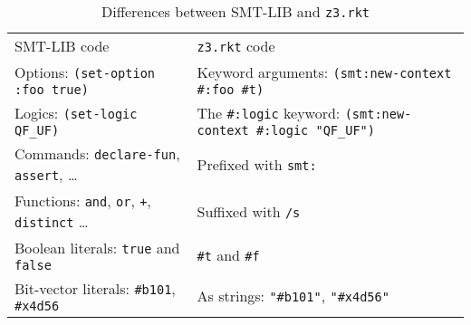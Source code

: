 \begin{table}[hbt]
\caption{Differences between SMT-LIB and \texttt{z3.rkt}}
\label{table:smt-porting}
\begin{center}
\begin{tabularx}{0.91\textwidth}{lX}
\hline\noalign{\smallskip}
SMT-LIB code & \texttt{z3.rkt} code \\
\noalign{\smallskip}
\hline
\noalign{\smallskip}
Options: \texttt{(set-option :foo true)} & Keyword arguments: \newline \texttt{(smt:new-context \#:foo \#t)} \\

Logics: \texttt{(set-logic QF\_UF)} & The \texttt{\#:logic} keyword: \newline \texttt{(smt:new-context \#:logic "QF\_UF")} \\

Commands: \texttt{declare-fun}, \texttt{assert}, \ldots & Prefixed with \texttt{smt:} \\

Functions: \texttt{and}, \texttt{or}, \texttt{+}, \texttt{distinct} \ldots & Suffixed with \texttt{/s} \\

Boolean literals: \texttt{true} and \texttt{false} & \texttt{\#t} and \texttt{\#f} \\

Bit-vector literals: \texttt{\#b101}, \texttt{\#x4d56} & As strings: \texttt{"\#b101"}, \texttt{"\#x4d56"} \\
\hline
\end{tabularx}
\end{center}
\end{table}
